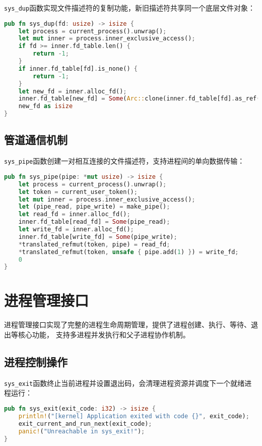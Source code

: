 \texttt{sys\_dup}函数实现文件描述符的复制功能，新旧描述符共享同一个底层文件对象：

\begin{lstlisting}[language=Rust,caption={文件描述符复制}, label={lst:sys-dup}]
pub fn sys_dup(fd: usize) -> isize {
    let process = current_process().unwrap();
    let mut inner = process.inner_exclusive_access();
    if fd >= inner.fd_table.len() {
        return -1;
    }
    if inner.fd_table[fd].is_none() {
        return -1;
    }
    let new_fd = inner.alloc_fd();
    inner.fd_table[new_fd] = Some(Arc::clone(inner.fd_table[fd].as_ref().unwrap()));
    new_fd as isize
}
\end{lstlisting}

\subsection{管道通信机制}

\texttt{sys\_pipe}函数创建一对相互连接的文件描述符，支持进程间的单向数据传输：

\begin{lstlisting}[language=Rust,caption={管道创建系统调用}, label={lst:sys-pipe}]
pub fn sys_pipe(pipe: *mut usize) -> isize {
    let process = current_process().unwrap();
    let token = current_user_token();
    let mut inner = process.inner_exclusive_access();
    let (pipe_read, pipe_write) = make_pipe();
    let read_fd = inner.alloc_fd();
    inner.fd_table[read_fd] = Some(pipe_read);
    let write_fd = inner.alloc_fd();
    inner.fd_table[write_fd] = Some(pipe_write);
    *translated_refmut(token, pipe) = read_fd;
    *translated_refmut(token, unsafe { pipe.add(1) }) = write_fd;
    0
}
\end{lstlisting}

\section{进程管理接口}

进程管理接口实现了完整的进程生命周期管理，提供了进程创建、执行、等待、退出等核心功能，
支持多进程并发执行和父子进程协作机制。

\subsection{进程控制操作}

\texttt{sys\_exit}函数终止当前进程并设置退出码，会清理进程资源并调度下一个就绪进程运行：

\begin{lstlisting}[language=Rust,caption={进程退出系统调用}, label={lst:sys-exit}]
pub fn sys_exit(exit_code: i32) -> isize {
    println!("[kernel] Application exited with code {}", exit_code);
    exit_current_and_run_next(exit_code);
    panic!("Unreachable in sys_exit!");
}
\end{lstlisting}


